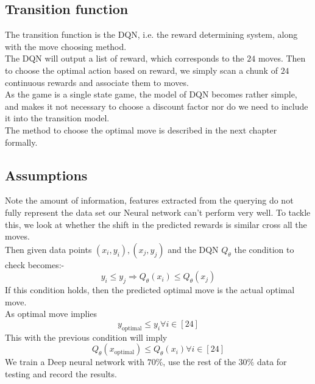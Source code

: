 \subsection{Transition function}
The transition function is the DQN, i.e. the reward determining system, along with the move choosing method. \\
The DQN will output a list of reward, which corresponds to the $24$ moves. Then to choose the optimal action based on reward, we simply scan a chunk of $24$ continuous rewards and associate them to moves.\\
As the game is a single state game, the model of DQN becomes rather simple, and makes it not necessary to choose a discount factor nor do we need to include it into the transition model.\\ 
The method to choose the optimal move is described in the next chapter formally.

\subsection{Assumptions}
Note the amount of information, features extracted from the querying do not fully represent the data set our Neural network can't perform very well. To tackle this, we look at whether the shift in the predicted rewards is similar cross all the moves.\\
Then given data points $(x_{i},y_{i}),(x_{j},y_{j})$ and the DQN $Q_{\theta}$ the condition to check becomes:-
$$y_{i}\leq y_{j}\Rightarrow Q_{\theta}(x_{i})\leq Q_{\theta}(x_{j})$$
If this condition holds, then the predicted optimal move is the actual optimal move. \\
As optimal move implies
$$y_{\text{optimal}}\leq y_{i} \forall i \in [24]$$
This with the previous condition will imply
$$Q_{\theta}(x_{\text{optimal}})\leq Q_{\theta}(x_{i})\forall i \in [24]$$ 
We train a Deep neural network with $70\%$, use the rest of the $30\%$ data for testing and record the results.


